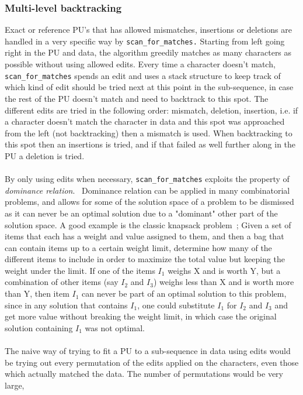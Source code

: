 \documentclass[12pt]{article}
\newcommand{\scm}{\texttt{scan\_for\_matches} }
\newcommand{\scmp}{\texttt{scan\_for\_matches.}}
\newcommand{\pu}{PU }
\newcommand{\pus}{PU's }
\begin{document}
\subsubsection{Multi-level backtracking}
Exact or reference \pus that has allowed mismatches, insertions or deletions are handled in a very specific way by \scmp
Starting from left going right in the \pu
and data, the algorithm greedily matches as many characters as possible without using allowed edits.
Every time a character doesn't match, \scm spends an edit and uses a stack structure to keep track of which
kind of edit should be tried next at this point in the sub-sequence, in case the rest of the \pu doesn't match and need to
backtrack to this spot. The different edits are tried in the following order: mismatch, deletion, insertion, i.e.
if a character doesn't match the character in data and this spot was approached from the left (not backtracking)
then a mismatch is used. When backtracking to this spot then an insertions is tried, and if that failed as well further along 
in the \pu a deletion is tried. \\ \\
By only using edits when necessary, \scm exploits the property of \emph{dominance relation}.~\cite{dom}
Dominance relation can be applied in many combinatorial problems, and allows for some of the solution
space of a problem to be dismissed as it can never be an optimal solution due to a "dominant" other part of the solution space. 
A good example is the classic knapsack problem~\cite{knap}; 
Given a set of items that each has a weight and value assigned to them,
and then a bag that can contain items up to a certain weight limit, determine how many of the different items to
include in order to maximize the total value but keeping the weight under the limit. If one of the items $I_1$ weighs
X and is worth Y, but a combination of other items (say $I_2$ and $I_3$) weighs less than X and is worth more than Y, 
then item $I_1$ can never be part of an optimal solution to this problem, since in any solution that contains $I_1$, 
one could substitute $I_1$ for $I_2$ and $I_3$ and get more value without breaking the weight limit, in which case the 
original solution containing $I_1$ was not optimal. \\ \\
The naive way of trying to fit a \pu to a sub-sequence in data using edits would be trying out every permutation of the edits
applied on the characters, even those which actually matched the data. The number of permutations would be very large,
\end{document}
